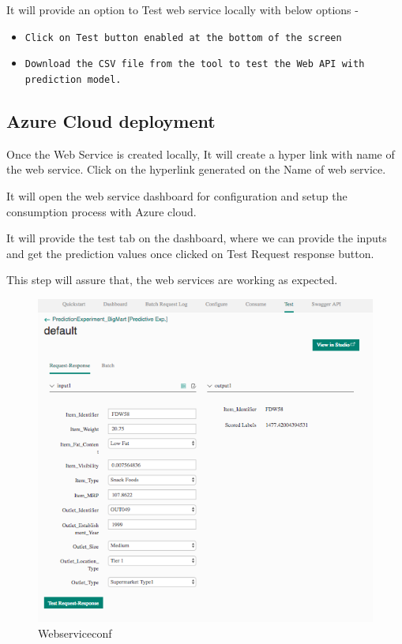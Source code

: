 It will provide an option to Test web service locally with below options -
\begin{itemize}
\item \verb|Click on Test button enabled at the bottom of the screen|
\item \verb|Download the CSV file from the tool to test the Web API with prediction model.|
\end{itemize}

\subsection{Azure Cloud deployment}
Once the Web Service is created locally, It will create a hyper link with name of the web 
service. 
Click on the hyperlink generated on the Name of web service.

It will open the web service dashboard for configuration and setup the consumption process 
with Azure cloud.

It will provide the test tab on the dashboard, where we can provide the inputs and get the 
prediction values once clicked on Test Request response button.

This step will assure that, the web services are working as expected.

\begin{figure}[pic7]
	\centering\includegraphics[width=\columnwidth]{Images/mlstudio/Webserviceconf.png}
	\caption{Webserviceconf}\label{fig:Webserviceconf}
\end{figure}

